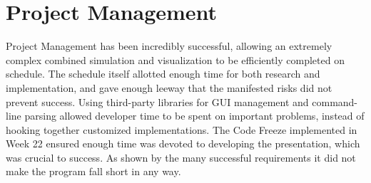\section{Project Management}
Project Management has been incredibly successful, allowing an extremely complex combined simulation and visualization to be efficiently completed on schedule.
The schedule itself allotted enough time for both research and implementation, and gave enough leeway that the manifested risks did not prevent success.
Using third-party libraries for GUI management and command-line parsing allowed developer time to be spent on important problems, instead of hooking together customized implementations.
The Code Freeze implemented in Week 22 ensured enough time was devoted to developing the presentation, which was crucial to success.
As shown by the many successful requirements it did not make the program fall short in any way.






